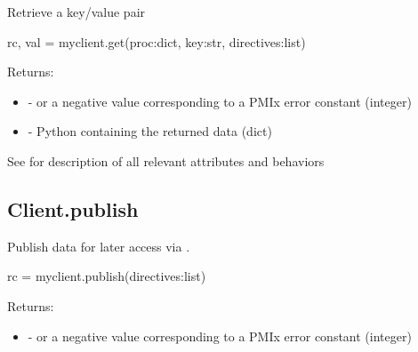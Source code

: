 \summary

Retrieve a key/value pair

\format

\pyspecificstart
\begin{codepar}
rc, val = myclient.get(proc:dict, key:str, directives:list)
\end{codepar}
\pyspecificend

\begin{arglist}
\end{arglist}

Returns:

\begin{itemize}
    \item {} -  or a negative value corresponding to a PMIx error constant (integer)
    \item {} - Python  containing the returned data (dict)
\end{itemize}


See  for description of all relevant attributes and behaviors


\subsection{Client.publish}

\summary

Publish data for later access via .

\format

\pyspecificstart
\begin{codepar}
rc = myclient.publish(directives:list)
\end{codepar}
\pyspecificend

\begin{arglist}
\end{arglist}

Returns:

\begin{itemize}
    \item {} -  or a negative value corresponding to a PMIx error constant (integer)
\end{itemize}


